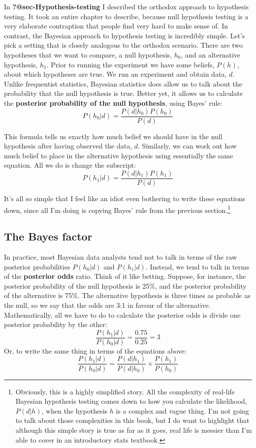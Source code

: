 \documentclass[
  a4paper,
]{book}
\begin{document}
In \textbf{?@sec-Hypothesis-testing} I described the orthodox approach
to hypothesis testing. It took an entire chapter to describe, because
null hypothesis testing is a very elaborate contraption that people find
very hard to make sense of. In contrast, the Bayesian approach to
hypothesis testing is incredibly simple. Let's pick a setting that is
closely analogous to the orthodox scenario. There are two hypotheses
that we want to compare, a null hypothesis, \(h_0\), and an alternative
hypothesis, \(h_1\). Prior to running the experiment we have some
beliefs, \(P(h)\), about which hypotheses are true. We run an experiment
and obtain data, \(d\). Unlike frequentist statistics, Bayesian
statistics does allow us to talk about the probability that the null
hypothesis is true. Better yet, it allows us to calculate the
\textbf{posterior probability of the null hypothesis}, using Bayes'
rule: \[P(h_0|d)=\frac{P(d|h_0)P(h_0)}{P(d)}\]

This formula tells us exactly how much belief we should have in the null
hypothesis after having observed the data, \(d\). Similarly, we can work
out how much belief to place in the alternative hypothesis using
essentially the same equation. All we do is change the subscript:
\[P(h_1|d)=\frac{P(d|h_1)P(h_1)}{P(d)}\]

It's all so simple that I feel like an idiot even bothering to write
these equations down, since all I'm doing is copying Bayes' rule from
the previous section.\footnote{Obviously, this is a highly simplified
  story. All the complexity of real-life Bayesian hypothesis testing
  comes down to how you calculate the likelihood, \(P(d|h)\), when the
  hypothesis \(h\) is a complex and vague thing. I'm not going to talk
  about those complexities in this book, but I do want to highlight that
  although this simple story is true as far as it goes, real life is
  messier than I'm able to cover in an introductory stats textbook.}

\hypertarget{the-bayes-factor}{%
\subsection{The Bayes factor}\label{the-bayes-factor}}

In practice, most Bayesian data analysts tend not to talk in terms of
the raw posterior probabilities \(P(h_0|d)\) and \(P(h_1|d)\). Instead,
we tend to talk in terms of the \textbf{posterior odds} ratio. Think of
it like betting. Suppose, for instance, the posterior probability of the
null hypothesis is 25\%, and the posterior probability of the
alternative is 75\%. The alternative hypothesis is three times as
probable as the null, so we say that the odds are 3:1 in favour of the
alternative. Mathematically, all we have to do to calculate the
posterior odds is divide one posterior probability by the other:
\[\frac{P(h_1|d)}{P(h_0|d)}=\frac{0.75}{0.25}=3\] Or, to write the same
thing in terms of the equations above:
\[\frac{P(h_1|d)}{P(h_0|d)}=\frac{P(d|h_1)}{P(d|h_0)} \times \frac{P(h_1)}{P(h_0)}\]
\end{document}
